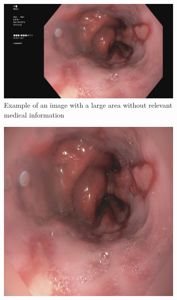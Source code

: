 \begin{figure}
     \centering
     \begin{subfigure}[t]{0.4\textwidth}
         \centering
         \includegraphics[height=\textwidth, width=\textwidth]{experiments/figures/leftframe.jpg}
         \caption{Example of an image with a large area without relevant medical information}
         \label{fig:LargeLeftBlack}
     \end{subfigure}
     \hfill
     \begin{subfigure}[t]{0.4\textwidth}
         \centering
         \includegraphics[height=\textwidth, width=\textwidth]{experiments/figures/noleftframe.jpg}

\end{subfigure}
\end{figure}
